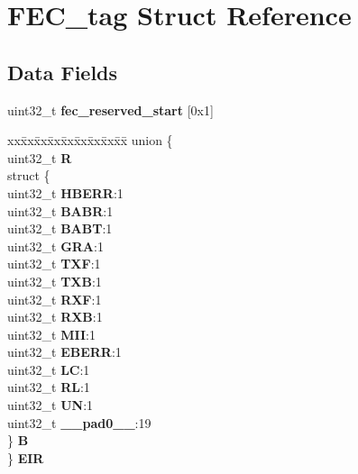 \hypertarget{structFEC__tag}{}\section{F\+E\+C\+\_\+tag Struct Reference}
\label{structFEC__tag}
\subsection*{Data Fields}
\begin{DoxyCompactItemize}
\item 
\mbox{\label{structFEC__tag_a272002fe1826730749890e387557245c}} 
uint32\+\_\+t {\bfseries fec\+\_\+reserved\+\_\+start} \mbox{[}0x1\mbox{]}
\item 
\mbox{\label{structFEC__tag_a56a5bc963fb828365970d7a2337a2b69}} 
\begin{tabbing}
xx\=xx\=xx\=xx\=xx\=xx\=xx\=xx\=xx\=\kill
union \{\\
\>uint32\_t {\bfseries R}\\
\>struct \{\\
\>\>uint32\_t {\bfseries HBERR}:1\\
\>\>uint32\_t {\bfseries BABR}:1\\
\>\>uint32\_t {\bfseries BABT}:1\\
\>\>uint32\_t {\bfseries GRA}:1\\
\>\>uint32\_t {\bfseries TXF}:1\\
\>\>uint32\_t {\bfseries TXB}:1\\
\>\>uint32\_t {\bfseries RXF}:1\\
\>\>uint32\_t {\bfseries RXB}:1\\
\>\>uint32\_t {\bfseries MII}:1\\
\>\>uint32\_t {\bfseries EBERR}:1\\
\>\>uint32\_t {\bfseries LC}:1\\
\>\>uint32\_t {\bfseries RL}:1\\
\>\>uint32\_t {\bfseries UN}:1\\
\>\>uint32\_t {\bfseries \_\_pad0\_\_}:19\\
\>\} {\bfseries B}\\
\} {\bfseries EIR}\\


\end{tabbing}
\end{DoxyCompactItemize}
